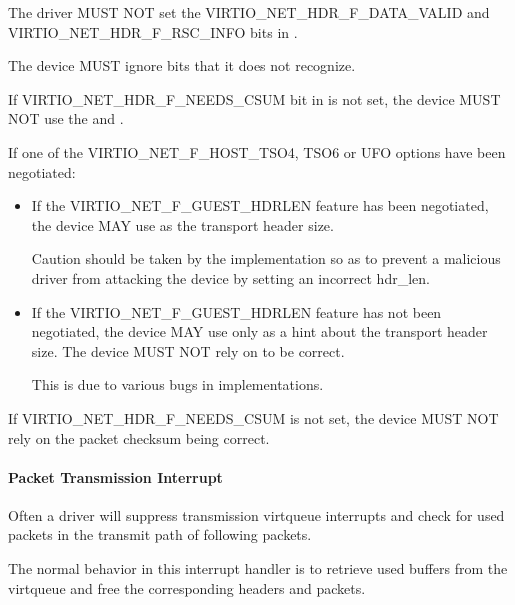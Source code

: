 The driver MUST NOT set the VIRTIO_NET_HDR_F_DATA_VALID and
VIRTIO_NET_HDR_F_RSC_INFO bits in .

The device MUST ignore  bits that it does not recognize.

If VIRTIO_NET_HDR_F_NEEDS_CSUM bit in  is not set, the
device MUST NOT use the  and .

If one of the VIRTIO_NET_F_HOST_TSO4, TSO6 or UFO options have
been negotiated:
\begin{itemize}
\item If the VIRTIO_NET_F_GUEST_HDRLEN feature has been negotiated,
	the device MAY use  as the transport header size.

	\begin{note}
	Caution should be taken by the implementation so as to prevent
	a malicious driver from attacking the device by setting an incorrect hdr_len.
	\end{note}

\item If the VIRTIO_NET_F_GUEST_HDRLEN feature has not been negotiated,
	the device MAY use  only as a hint about the
	transport header size.
	The device MUST NOT rely on  to be correct.

	\begin{note}
	This is due to various bugs in implementations.
	\end{note}
\end{itemize}

If VIRTIO_NET_HDR_F_NEEDS_CSUM is not set, the device MUST NOT
rely on the packet checksum being correct.
\paragraph{Packet Transmission Interrupt}\label{sec:Device Types / Network Device / Device Operation / Packet Transmission / Packet Transmission Interrupt}

Often a driver will suppress transmission virtqueue interrupts
and check for used packets in the transmit path of following
packets.

The normal behavior in this interrupt handler is to retrieve
used buffers from the virtqueue and free the corresponding
headers and packets.

